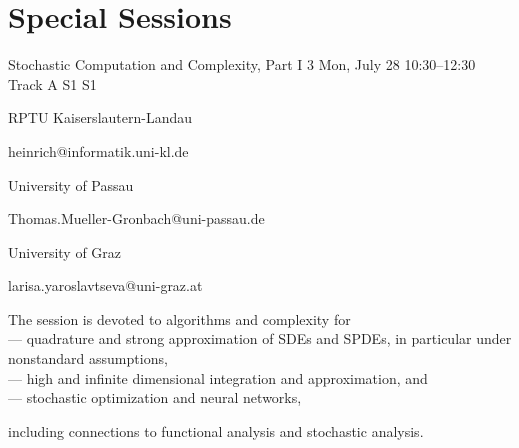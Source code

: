 \section{Special Sessions}
\begin{talk}
  {Stochastic Computation and Complexity, Part I}%
  {3}%
  {}%
  {}%
  {}%
  {}%
  {Mon, July 28 10:30–12:30 Track A}%
  {S1}%
  {S1}%


  {%


	{RPTU Kaiserslautern-Landau}%


	{heinrich@informatik.uni-kl.de}}%


 {%


{University of Passau}%


    {Thomas.Mueller-Gronbach@uni-passau.de}}%


  {%


	{University of Graz}%


	{larisa.yaroslavtseva@uni-graz.at}}%





The session is devoted to algorithms and complexity for\\





--- quadrature and strong approximation of SDEs and SPDEs, in particular under nonstandard assumptions,\\





--- high and infinite dimensional integration and approximation, and\\





--- stochastic optimization and neural networks,





including connections to functional analysis and stochastic analysis.









\end{talk}
